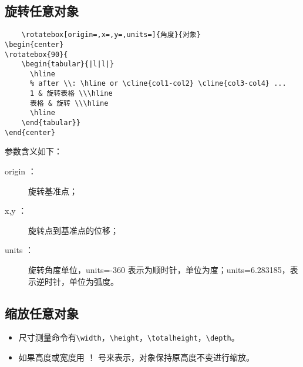 \subsection{旋转任意对象}
\begin{shaded}
  \begin{Verbatim}
    \rotatebox[origin=,x=,y=,units=]{角度}{对象}   
\begin{center}
\rotatebox{90}{
    \begin{tabular}{|l|l|}
      \hline
      % after \\: \hline or \cline{col1-col2} \cline{col3-col4} ...
      1 & 旋转表格 \\\hline
      表格 & 旋转 \\\hline
      \hline
    \end{tabular}}
\end{center}
  \end{Verbatim}
\end{shaded}

参数含义如下：\\
\begin{description}
  \item[origin ：]旋转基准点；
  \item[x,y ：]旋转点到基准点的位移；
  \item[units ：] 旋转角度单位，units=-360 表示为顺时针，单位为度；units=6.283185，表示逆时针，单位为弧度。
\end{description}
\begin{center}
\end{center}

\subsection{缩放任意对象}
\begin{itemize}
  \item 尺寸测量命令有\verb$\width$，\verb$\height$，\verb$\totalheight$，\verb$\depth$。
  \item 如果高度或宽度用 ！ 号来表示，对象保持原高度不变进行缩放。
\end{itemize}


